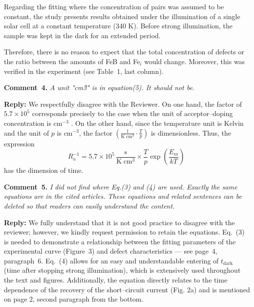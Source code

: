 \documentclass{WileyMSP-template}
\begin{document}
Regarding the fitting where the concentration of pairs was assumed to be constant,
the study presents results obtained under the illumination of a single solar cell at a constant temperature (340 K).
Before strong illumination, the sample was kept in the dark for an extended period.

Therefore, there is no reason to expect that the total concentration of defects or the ratio between the amounts
of FeB and Fe$_i$ would change.
Moreover, this was verified in the experiment (see Table~1, last column).


\vspace{1cm}
\noindent
\textcolor[rgb]{0.00,0.50,1.00}{\textbf{Comment~4.}}
\emph{A unit "cm\^3" is in equation(5). It should not be.}

\noindent
\textcolor[rgb]{0.51,0.00,0.00}{\textbf{Reply:}}
We respectfully disagree with the Reviewer.
On one hand, the factor of $5.7\times10^5$
corresponds precisely to the case
when the unit of acceptor--doping concentration is cm$^{-3}$ \cite{FeBAssJAP2014,FeBKin2019,FeBAssSST2011}.
On the other hand,
since the temperature unit is Kelvin
and the unit of $p$ is cm$^{-3}$,
the factor $\left(\frac{1}{\mathrm{K}\;\mathrm{cm}^3}\cdot\frac{T}{p}\right)$ is dimensionless.
Thus, the expression
\begin{equation}
\label{eqTass}
R_a^{-1}=5.7\times10^5\,\frac{\mathrm{s}}{\mathrm{K}\;\mathrm{cm}^3}\times\frac{T}{p}\exp\left(\frac{E_m}{kT}\right)\,
\end{equation}
has the dimension of time.


\vspace{1cm}
\noindent
\textcolor[rgb]{0.00,0.50,1.00}{\textbf{Comment~5.}}
\emph{ I did not find where Eq.(3) and (4) are used.
Exactly the same equations are in the cited articles.
These equations and related sentences can be deleted so that readers can easily understand the content.}

\noindent
\textcolor[rgb]{0.51,0.00,0.00}{\textbf{Reply:}}
We fully understand that it is not good practice to disagree with the reviewer;
however, we kindly request permission to retain the equations.
Eq.~(3) is needed to demonstrate a relationship between the fitting parameters of the experimental curve
(Figure~3) and defect characteristics --- see page~4, paragraph~6.
Eq.~(4) allows for an easy and understandable entering of $t_\mathrm{dark}$
(time after stopping strong illumination),
which is extensively used throughout the text and figures.
Additionally, the equation directly relates to the time dependence of the recovery of the short--circuit current (Fig. 2a)
and is mentioned on page 2, second paragraph from the bottom.
\end{document}
